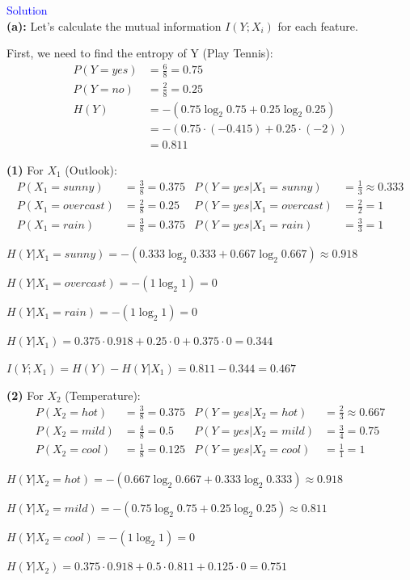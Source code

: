 \textcolor{blue}{Solution} \\

\textbf{(a):} Let's calculate the mutual information $I(Y;X_i)$ for each feature.

First, we need to find the entropy of Y (Play Tennis):
\begin{align*}
P(Y=yes) &= \frac{6}{8} = 0.75 \\
P(Y=no) &= \frac{2}{8} = 0.25 \\
H(Y) &= -(0.75\log_2 0.75 + 0.25\log_2 0.25) \\
&= -(0.75 \cdot (-0.415) + 0.25 \cdot (-2)) \\
&= 0.811
\end{align*}

\textbf{(1)} For $X_1$ (Outlook):
\begin{align*}
P(X_1=sunny) &= \frac{3}{8} = 0.375 & P(Y=yes|X_1=sunny) &= \frac{1}{3} \approx 0.333 \\
P(X_1=overcast) &= \frac{2}{8} = 0.25 & P(Y=yes|X_1=overcast) &= \frac{2}{2} = 1 \\
P(X_1=rain) &= \frac{3}{8} = 0.375 & P(Y=yes|X_1=rain) &= \frac{3}{3} = 1
\end{align*}

$H(Y|X_1=sunny) = -(0.333\log_2 0.333 + 0.667\log_2 0.667) \approx 0.918$

$H(Y|X_1=overcast) = -(1\log_2 1) = 0$

$H(Y|X_1=rain) = -(1\log_2 1) = 0$

$H(Y|X_1) = 0.375 \cdot 0.918 + 0.25 \cdot 0 + 0.375 \cdot 0 = 0.344$

$I(Y;X_1) = H(Y) - H(Y|X_1) = 0.811 - 0.344 = 0.467$

\textbf{(2)} For $X_2$ (Temperature):
\begin{align*}
P(X_2=hot) &= \frac{3}{8} = 0.375 & P(Y=yes|X_2=hot) &= \frac{2}{3} \approx 0.667 \\
P(X_2=mild) &= \frac{4}{8} = 0.5 & P(Y=yes|X_2=mild) &= \frac{3}{4} = 0.75 \\
P(X_2=cool) &= \frac{1}{8} = 0.125 & P(Y=yes|X_2=cool) &= \frac{1}{1} = 1
\end{align*}

$H(Y|X_2=hot) = -(0.667\log_2 0.667 + 0.333\log_2 0.333) \approx 0.918$

$H(Y|X_2=mild) = -(0.75\log_2 0.75 + 0.25\log_2 0.25) \approx 0.811$

$H(Y|X_2=cool) = -(1\log_2 1) = 0$

$H(Y|X_2) = 0.375 \cdot 0.918 + 0.5 \cdot 0.811 + 0.125 \cdot 0 = 0.751$

